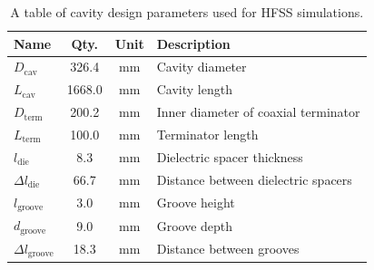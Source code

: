 \begin{table}[htbp]
    \centering
    \caption{\label{tab:chap6-cavity-sim-params} A table of cavity design parameters used for HFSS simulations.}
    \begin{tabular}{l|c|c|l}
        \hline
        Name & Qty. & Unit & Description \\
        \hline
        $D_\mathrm{cav}$ & 326.4 & mm & Cavity diameter\\
        $L_\mathrm{cav}$ & 1668.0 & mm & Cavity length\\
        $D_\mathrm{term}$ & 200.2 & mm & Inner diameter of coaxial terminator\\
        $L_\mathrm{term}$ & 100.0 & mm & Terminator length\\
        $l_\mathrm{die}$ & 8.3 & mm & Dielectric spacer thickness\\
        $\Delta l_\mathrm{die}$ & 66.7 & mm & Distance between dielectric spacers\\
        $l_\mathrm{groove}$ & 3.0 & mm & Groove height\\
        $d_\mathrm{groove}$ & 9.0 & mm & Groove depth\\
        $\Delta l_\mathrm{groove}$ & 18.3 & mm & Distance between grooves \\
        \hline
    \end{tabular}
\end{table}

